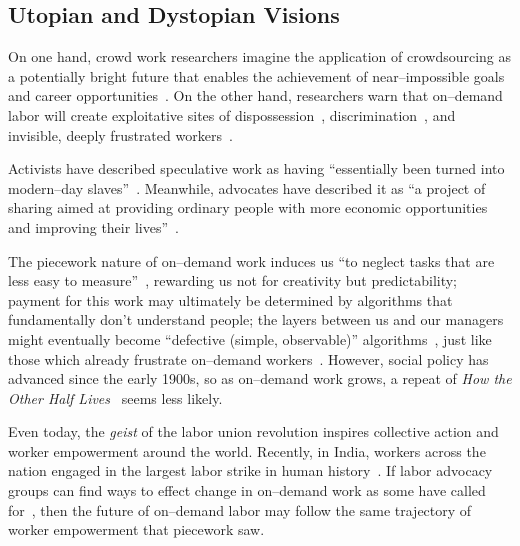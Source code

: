 \documentclass[pn4226]{subfiles}
\begin{document}
\subsection{Utopian and Dystopian Visions}\label{sec:polarizationOfCrowdWork}
On one hand, crowd work researchers
imagine the application of crowdsourcing as
a potentially bright future that enables the achievement of near--impossible goals and career opportunities~\cite{redballoon,crowdworkFuture,vizwiz,suzukiAtelier}.
On the other hand, researchers
warn that on--demand labor will create exploitative sites of dispossession~\cite{scholz2012digital},
discrimination~\cite{edelman2015racial},
and invisible, deeply frustrated workers~\cite{turkopticon,bighamHalfWorkday}.

Activists have described speculative work as having
``essentially been turned into modern--day slaves''~\cite{activistsHuffPoLawsuit}.
Meanwhile, advocates have described it as
``a project of sharing aimed at providing ordinary people with more economic opportunities and improving their lives''~\cite{uberPropaganda}.

The piecework nature of on--demand work induces us
``to neglect tasks that are less easy to measure''~\cite{SJOE:SJOE371},
rewarding us not for creativity but predictability;
payment for this work may ultimately be determined by
algorithms that fundamentally don't understand people;
the layers between us and our managers might eventually become
``defective (simple, observable)'' algorithms~\cite{10.2307/2555446},
just like those which already frustrate
on--demand workers~\cite{uberAlgorithm,dynamo,turkopticon}.
However, social policy has advanced since the early 1900s, so as on--demand work grows, a repeat of \textit{How the Other Half Lives}~\cite{riisOtherSideLives} seems less likely.

Even today, the \textit{geist} of the labor union revolution
inspires collective action and worker empowerment around the world.
Recently, in India, workers across the nation engaged in
the largest labor strike in human history~\cite{indiaStrikeRealNews}.
If labor advocacy groups can find ways to effect change in on--demand work as some have called for~\cite{futureUnions},
then the future of on--demand labor may follow
the same trajectory of worker empowerment that piecework saw.
\end{document}
